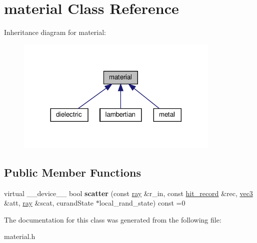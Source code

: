 \hypertarget{classmaterial}{}\section{material Class Reference}
\label{classmaterial}


Inheritance diagram for material\+:
\nopagebreak
\begin{figure}[H]
\begin{center}
\leavevmode
\includegraphics[width=276pt]{classmaterial__inherit__graph}
\end{center}
\end{figure}
\subsection*{Public Member Functions}
\begin{DoxyCompactItemize}
\item 
\mbox{\label{classmaterial_a5e109a7685ecebe1cb9ca6d0cd7481d8}} 
virtual \+\_\+\+\_\+device\+\_\+\+\_\+ bool {\bfseries scatter} (const \hyperlink{classray}{ray} \&r\+\_\+in, const \hyperlink{structhit__record}{hit\+\_\+record} \&rec, \hyperlink{classvec3}{vec3} \&att, \hyperlink{classray}{ray} \&scat, curand\+State $\ast$local\+\_\+rand\+\_\+state) const =0
\end{DoxyCompactItemize}


The documentation for this class was generated from the following file\+:\begin{DoxyCompactItemize}
\item 
material.\+h\end{DoxyCompactItemize}
